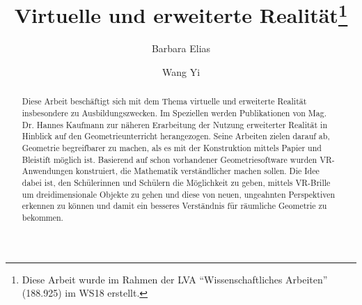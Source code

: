 \documentclass[deutsch]{llncs}
\begin{document}
\def\abstractname{Kurzfassung.}

\pagestyle{plain}

\title{Virtuelle und erweiterte Realität\thanks{Diese Arbeit wurde im Rahmen der LVA ``Wissenschaftliches Arbeiten'' (188.925) im WS18 erstellt.}}




\author{Barbara Elias \and Wang Yi}


\maketitle

\setcounter{footnote}{0}

\begin{abstract}
Diese Arbeit beschäftigt sich mit dem Thema virtuelle und erweiterte Realität insbesondere zu Ausbildungszwecken. Im Speziellen werden Publikationen von Mag. Dr. Hannes Kaufmann zur näheren Erarbeitung der Nutzung erweiterter Realität in Hinblick auf den Geometrieunterricht herangezogen. Seine Arbeiten zielen darauf ab, Geometrie begreifbarer zu machen, als es mit der Konstruktion mittels Papier und Bleistift möglich ist. Basierend auf schon vorhandener Geometriesoftware wurden VR-Anwendungen konstruiert, die Mathematik verständlicher machen sollen. Die Idee dabei ist, den Schülerinnen und Schülern die Möglichkeit zu geben, mittels VR-Brille um dreidimensionale Objekte zu gehen und diese von neuen, ungeahnten Perspektiven erkennen zu können und damit ein besseres Verständnis für räumliche Geometrie zu bekommen. 
\end{abstract}
\end{document}
